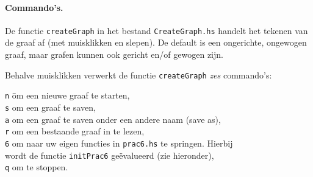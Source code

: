 \documentclass[11pt]{article}
\begin{document}
\paragraph{Commando's.}
De functie \verb!createGraph! in het bestand \verb!CreateGraph.hs!
handelt het tekenen van de graaf af (met muisklikken en slepen).
De default is een ongerichte, ongewogen graaf, maar grafen kunnen ook
gericht en/of gewogen zijn.

Behalve muisklikken verwerkt de functie \verb!createGraph! \emph{zes}
commando's:
\begin{tabbing}
  \hspace{1em}
    \= \verb!n! \hspace{2em}
    \= om een nieuwe graaf te starten,				\\
    \> \verb!s!
    \> om een graaf te saven,					\\
    \> \verb!a!
    \> om een graaf te saven onder een andere naam (save as),	\\
    \> \verb!r!
    \> om een bestaande graaf in te lezen,			\\
    \> \verb!6!
    \> om naar uw eigen functies in \verb!prac6.hs! te springen.
       Hierbij							\\
    \>
    \> wordt de functie \verb!initPrac6! ge\"evalueerd (zie
    	hieronder),						\\
    \> \verb!q!
    \> om te stoppen.
\end{tabbing}
\end{document}
